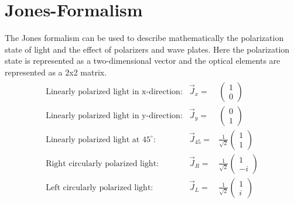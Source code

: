 \section{Jones-Formalism}

The Jones formalism can be used to describe mathematically the polarization state of light and the effect of polarizers and wave plates.
Here the polarization state is represented as a two-dimensional vector and the optical elements are represented as a 2x2 matrix. 
\begin{equation*}
\begin{aligned}
\begin{array}{lcl}
\text{Linearly polarized light in x-direction:} &
\vec{J}_x = &
\begin{pmatrix} 1 \\ 0 \end{pmatrix}
\\[0.5em]

\text{Linearly polarized light in y-direction:} &
\vec{J}_y = &
\begin{pmatrix} 0 \\ 1 \end{pmatrix}
\\[0.5em]

\text{Linearly polarized light at }45^\circ\text{:} &
\vec{J}_{45} = &
\frac{1}{\sqrt{2}}
\begin{pmatrix} 1 \\ 1 \end{pmatrix}
\\[0.5em]

\text{Right circularly polarized light:} &
\vec{J}_R = &
\frac{1}{\sqrt{2}}
\begin{pmatrix} 1 \\ -i \end{pmatrix}
\\[0.5em]

\text{Left circularly polarized light:} &
\vec{J}_L = &
\frac{1}{\sqrt{2}}
\begin{pmatrix} 1 \\ i \end{pmatrix}
\end{array}
\end{aligned}
\end{equation*}

